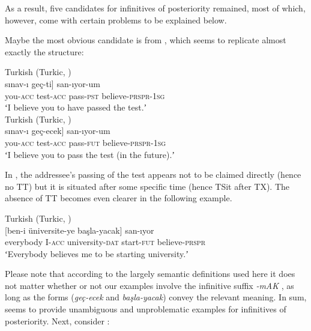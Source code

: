 \documentclass[output=paper,hidelinks]{langscibook}
\begin{document}
As a result, five candidates for infinitives of posteriority remained, most of which, however, come with certain problems to be explained below.

Maybe the most obvious candidate is from , which seems to replicate almost exactly the  structure:

\ea\label{ex:reiner:5} Turkish (Turkic, \citealt[312]{Kornfilt2007})\\
\gll {[Sen-i}		    {sınav-ı}	            {geç-ti]}         {san-ıyor-um}\\
 you-\textsc{acc} test-\textsc{acc} pass-\textsc{pst}	believe-\textsc{prspr}-\textsc{1sg}\\    
\glt ʻI believe you to have passed the test.ʼ\\
\ex\label{ex:reiner:6} Turkish (Turkic, \citealt[312]{Kornfilt2007}) \\
\gll {[Seni-i}		{sınav-ı}	{geç-ecek]}   {san-ıyor-um}\\
    you-\textsc{acc} test-\textsc{acc}	pass-\textsc{fut}    believe-\textsc{prspr}-\textsc{1sg}\\
\glt ʻI believe you to pass the test (in the future).ʼ
\z

In , the addressee’s passing of the test appears not to be claimed directly (hence no TT) but it is situated after some specific time (hence TSit after TX). The absence of TT becomes even clearer in the following example.

\ea\label{ex:reiner:7} Turkish (Turkic, \citealt[557]{Kornfilt2018}) \\
		{[ben-i}		{üniversite-ye}   {başla-yacak]}	{san-ıyor}\\
    everybody	I-\textsc{acc}		university-\textsc{dat}  start-\textsc{fut}	believe-\textsc{prspr}\\
\glt ʻEverybody believes me to be starting university.ʼ\\
\z

Please note that according to the largely semantic definitions used here it does not matter whether or not our examples involve the  infinitive suffix \emph{\hbox{-}mAK} \citep[392]{Kornfilt1997}, as long as the forms (\emph{geç-ecek} and \emph{başla-yacak}) convey the relevant meaning. In sum,  seems to provide unambiguous and unproblematic examples for infinitives of posteriority.
Next, consider :\largerpage[-1]
\end{document}
